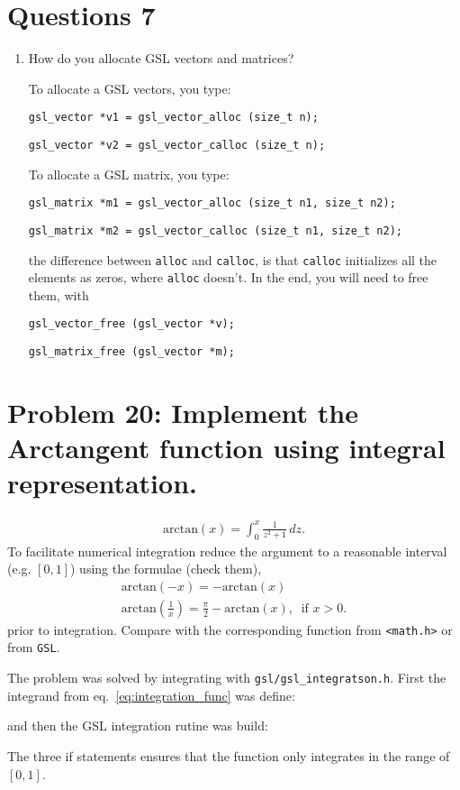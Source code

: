 \documentclass[10pt]{article}
\begin{document}
	\section*{Questions 7}
	\begin{enumerate}
		\item How do you allocate GSL vectors and matrices?
		
		To allocate a GSL vectors, you type:

		\texttt{gsl\_vector *v1 = gsl\_vector\_alloc (size\_t n);}

		\texttt{gsl\_vector *v2 = gsl\_vector\_calloc (size\_t n);}

		To allocate a GSL matrix, you type:

		\texttt{gsl\_matrix *m1 = gsl\_vector\_alloc (size\_t n1, size\_t n2);}

		\texttt{gsl\_matrix *m2 = gsl\_vector\_calloc (size\_t n1, size\_t n2);}

		the difference between \texttt{alloc} and \texttt{calloc}, is that \texttt{calloc} initializes all the elements as zeros, where \texttt{alloc} doesn't.
		In the end, you will need to free them, with

		\texttt{gsl\_vector\_free (gsl\_vector *v);}

		\texttt{gsl\_matrix\_free (gsl\_vector *m);}
		
	\end{enumerate}
	\section*{Problem 20: Implement the Arctangent function using integral representation.}
	\begin{align}
		\mathrm{arctan}(x) 
		= \int_{0}^{x} \frac{1}{z^2+1} \, dz. \label{eq:integration_func}
	\end{align}
	To facilitate numerical integration reduce the argument to a reasonable interval (e.g. $[0,1]$) using the formulae (check them),
	\begin{align}
		\mathrm{arctan}(-x) = -\mathrm{arctan}(x) \\
		\mathrm{arctan}\!\left(\frac{1}{x}\right) =
		\frac{\pi}{2} - \mathrm{arctan}(x), \ \text{ if } x > 0.
	\end{align}
	prior to integration. Compare with the corresponding function from \texttt{<math.h>} or from \texttt{GSL}.
	
	The problem was solved by integrating with \texttt{gsl/gsl\_integratson.h}. First the integrand from eq.~\ref{eq:integration_func} was define:
	
	 and then the GSL integration rutine was build:
	
	The three if statements ensures that the function only integrates in the range of $[0,1]$.
	
\end{document}
